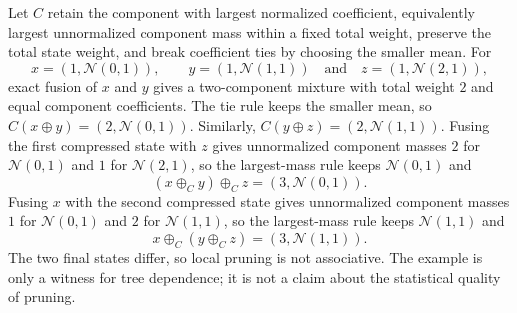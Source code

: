 \documentclass[runningheads]{llncs}
\newcommand{\N}{\mathcal{N}}
\begin{document}
Let $C$ retain the component with largest normalized coefficient, equivalently largest unnormalized component mass within a fixed total weight, preserve the total state weight, and break coefficient ties by choosing the smaller mean. For
\begin{equation*}
  x=(1,\N(0,1)),\qquad y=(1,\N(1,1))\quad\text{and}\quad z=(1,\N(2,1)),
\end{equation*}
exact fusion of $x$ and $y$ gives a two-component mixture with total weight $2$ and equal component coefficients. The tie rule keeps the smaller mean, so $C(x\oplus y)=(2,\N(0,1))$. Similarly, $C(y\oplus z)=(2,\N(1,1))$. Fusing the first compressed state with $z$ gives unnormalized component masses $2$ for $\N(0,1)$ and $1$ for $\N(2,1)$, so the largest-mass rule keeps $\N(0,1)$ and
\begin{equation*}
  (x\oplus_Cy)\oplus_Cz=(3,\N(0,1)).
\end{equation*}
Fusing $x$ with the second compressed state gives unnormalized component masses $1$ for $\N(0,1)$ and $2$ for $\N(1,1)$, so the largest-mass rule keeps $\N(1,1)$ and
\begin{equation*}
  x\oplus_C(y\oplus_Cz)=(3,\N(1,1)).
\end{equation*}
The two final states differ, so local pruning is not associative. The example is only a witness for tree dependence; it is not a claim about the statistical quality of pruning.
\end{document}
